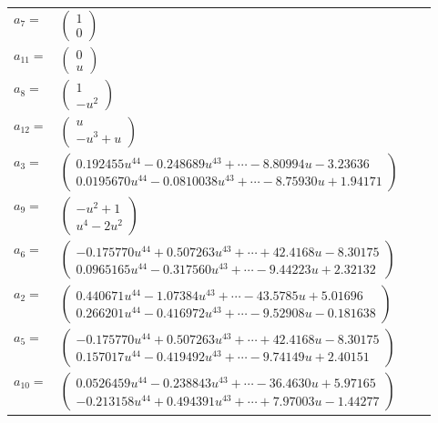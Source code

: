 \documentclass[1p]{elsarticle_modified}
\theoremstyle{definition}
\begin{document}
\begin{tabular}{m{7pt} m{180pt} m{7pt} m{180pt} }
\flushright $a_{7}=$&$\begin{pmatrix}1\\0\end{pmatrix}$ \\
\flushright $a_{11}=$&$\begin{pmatrix}0\\u\end{pmatrix}$ \\
\flushright $a_{8}=$&$\begin{pmatrix}1\\- u^2\end{pmatrix}$ \\
\flushright $a_{12}=$&$\begin{pmatrix}u\\- u^3+u\end{pmatrix}$ \\
\flushright $a_{3}=$&$\begin{pmatrix}0.192455 u^{44}-0.248689 u^{43}+\cdots-8.80994 u-3.23636\\0.0195670 u^{44}-0.0810038 u^{43}+\cdots-8.75930 u+1.94171\end{pmatrix}$ \\
\flushright $a_{9}=$&$\begin{pmatrix}- u^2+1\\u^4-2 u^2\end{pmatrix}$ \\
\flushright $a_{6}=$&$\begin{pmatrix}-0.175770 u^{44}+0.507263 u^{43}+\cdots+42.4168 u-8.30175\\0.0965165 u^{44}-0.317560 u^{43}+\cdots-9.44223 u+2.32132\end{pmatrix}$ \\
\flushright $a_{2}=$&$\begin{pmatrix}0.440671 u^{44}-1.07384 u^{43}+\cdots-43.5785 u+5.01696\\0.266201 u^{44}-0.416972 u^{43}+\cdots-9.52908 u-0.181638\end{pmatrix}$ \\
\flushright $a_{5}=$&$\begin{pmatrix}-0.175770 u^{44}+0.507263 u^{43}+\cdots+42.4168 u-8.30175\\0.157017 u^{44}-0.419492 u^{43}+\cdots-9.74149 u+2.40151\end{pmatrix}$ \\
\flushright $a_{10}=$&$\begin{pmatrix}0.0526459 u^{44}-0.238843 u^{43}+\cdots-36.4630 u+5.97165\\-0.213158 u^{44}+0.494391 u^{43}+\cdots+7.97003 u-1.44277\end{pmatrix}$ \\

\end{tabular}
\end{document}
